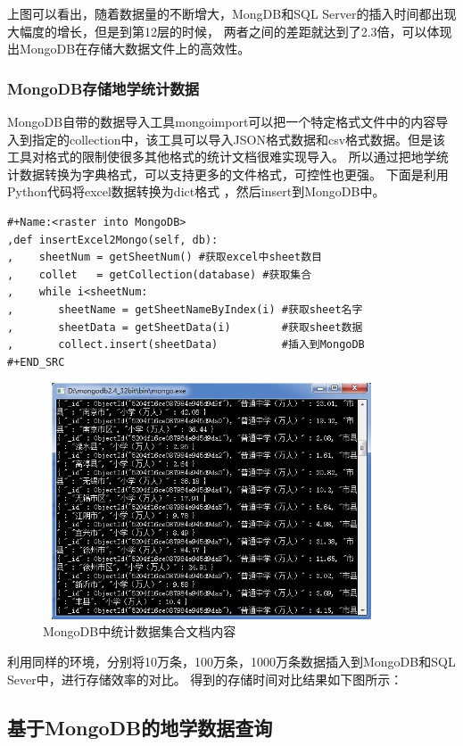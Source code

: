 \documentclass[master]{njnuthesis}
\begin{document}
上图可以看出，随着数据量的不断增大，MongDB和SQL Server的插入时间都出现大幅度的增长，但是到第12层的时候，
两者之间的差距就达到了2.3倍，可以体现出MongoDB在存储大数据文件上的高效性。

\subsubsection{MongoDB存储地学统计数据}
MongoDB自带的数据导入工具mongoimport可以把一个特定格式文件中的内容导入到指定的collection中，该工具可以导入JSON格式数据和csv格式数据。但是该工具对格式的限制使很多其他格式的统计文档很难实现导入。
所以通过把地学统计数据转换为字典格式，可以支持更多的文件格式，可控性也更强。
下面是利用Python代码将excel数据转换为dict格式 ，然后insert到MongoDB中。

\begin{verbatim}
#+Name:<raster into MongoDB>
,def insertExcel2Mongo(self, db):
,    sheetNum = getSheetNum() #获取excel中sheet数目
,    collet   = getCollection(database) #获取集合
,    while i<sheetNum:
,       sheetName = getSheetNameByIndex(i) #获取sheet名字
,       sheetData = getSheetData(i)        #获取sheet数据
,       collect.insert(sheetData)          #插入到MongoDB
#+END_SRC
\end{verbatim}

\begin{figure}[h]
\begin{center}
\includegraphics[angle=0,width=10cm,height=7cm]{pic//excel_data.jpg}
\caption{MongoDB中统计数据集合文档内容}
\label{fig:4}
\end{center}
\end{figure}
利用同样的环境，分别将10万条，100万条，1000万条数据插入到MongoDB和SQL Sever中，进行存储效率的对比。
得到的存储时间对比结果如下图所示：

\subsection{基于MongoDB的地学数据查询}
\end{document}
